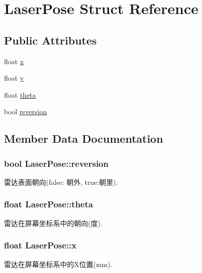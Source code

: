 \hypertarget{struct_laser_pose}{}\section{Laser\+Pose Struct Reference}
\label{struct_laser_pose}
\subsection*{Public Attributes}
\begin{DoxyCompactItemize}
\item 
float \hyperlink{struct_laser_pose_a80f6fbbc164fb2b3e8929778767797d6}{x}
\item 
float \hyperlink{struct_laser_pose_aaf1e1a4755babfaa45c64dd3e01b2c2d}{y}
\item 
float \hyperlink{struct_laser_pose_a666c69a4f946cfddd97b7627ae286dec}{theta}
\item 
bool \hyperlink{struct_laser_pose_a1c77bcb0aa458b48fbc127adab5cd415}{reversion}
\end{DoxyCompactItemize}


\subsection{Member Data Documentation}
\subsubsection[{\texorpdfstring{reversion}{reversion}}]{\setlength{\rightskip}{0pt plus 5cm}bool Laser\+Pose\+::reversion}\hypertarget{struct_laser_pose_a1c77bcb0aa458b48fbc127adab5cd415}{}\label{struct_laser_pose_a1c77bcb0aa458b48fbc127adab5cd415}
雷达表面朝向(false\+: 朝外, true\+:朝里). 
\subsubsection[{\texorpdfstring{theta}{theta}}]{\setlength{\rightskip}{0pt plus 5cm}float Laser\+Pose\+::theta}\hypertarget{struct_laser_pose_a666c69a4f946cfddd97b7627ae286dec}{}\label{struct_laser_pose_a666c69a4f946cfddd97b7627ae286dec}
雷达在屏幕坐标系中的朝向(度). 
\subsubsection[{\texorpdfstring{x}{x}}]{\setlength{\rightskip}{0pt plus 5cm}float Laser\+Pose\+::x}\hypertarget{struct_laser_pose_a80f6fbbc164fb2b3e8929778767797d6}{}\label{struct_laser_pose_a80f6fbbc164fb2b3e8929778767797d6}
雷达在屏幕坐标系中的\+X位置(mm). 
